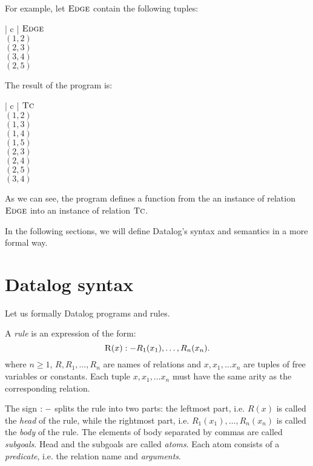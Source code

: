 For example, let $\textsc{Edge}$ contain the following tuples:

\begin{centab}{ | c | }
  \hline
  $\textsc{Edge}$ \\
  \hline
  $(1, 2)$ \\
  $(2, 3)$ \\
  $(3, 4)$ \\
  $(2, 5)$ \\
  \hline
\end{centab}

The result of the program is:

\begin{centab}{ | c | }
  \hline
  $\textsc{Tc}$ \\
  \hline
  $(1, 2)$ \\
  $(1, 3)$ \\
  $(1, 4)$ \\
  $(1, 5)$ \\
  $(2, 3)$ \\
  $(2, 4)$ \\
  $(2, 5)$ \\
  $(3, 4)$ \\
  \hline
\end{centab}

As we can see, the program defines a function from the an instance of relation $\textsc{Edge}$ into an instance of relation $\textsc{Tc}$.

In the following sections, we will define Datalog's syntax and semantics in a more formal way.

\section{Datalog syntax}
Let us formally Datalog programs and rules.

\begin{defn}
A \emph{rule} is an expression of the form:
$$ \textsc{R}(x) :- R_1(x_1), \dots, R_n(x_n). $$
where $n \ge 1$, $R, R_1, \dots, R_n$ are names of relations and $x, x_1, \dots x_n$ are tuples of free variables or constants. Each tuple $x, x_1, \dots x_n$ must have the same arity as the corresponding relation.
\end{defn}\label{d:datalogrule}

The sign $:-$ splits the rule into two parts: the leftmost part, i.e. $R(x)$ is called the \emph{head} of the rule, while the rightmost part, i.e. $R_1(x_1), \dots, R_n(x_n)$ is called the \emph{body} of the rule. The elements of body separated by commas are called \emph{subgoals}. Head and the subgoals are called \emph{atoms}. Each atom consists of a \emph{predicate}, i.e. the relation name and \emph{arguments}.

